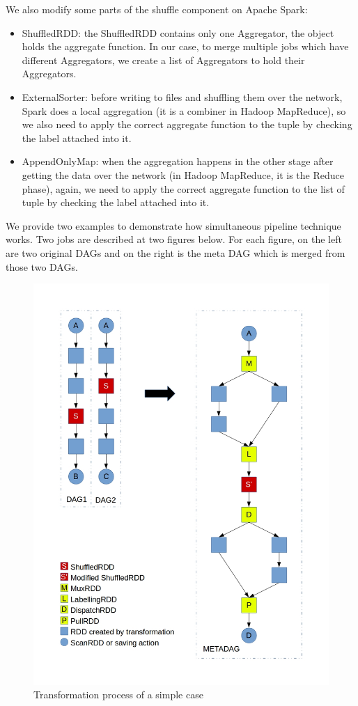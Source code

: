 We also modify some parts of the shuffle component on Apache Spark:
\begin{itemize}
\item ShuffledRDD: the ShuffledRDD contains only one Aggregator, the object holds the aggregate function. In our case, to merge multiple jobs which have different Aggregators, we create a list of Aggregators to hold their Aggregators.
\item ExternalSorter: before writing to files and shuffling them over the network, Spark does a local aggregation (it is a combiner in Hadoop MapReduce), so we also need to apply the correct aggregate function to the tuple by checking the label attached into it.
\item AppendOnlyMap: when the aggregation happens in the other stage after getting the data over the network (in Hadoop MapReduce, it is the Reduce phase), again, we need to apply the correct aggregate function to the list of tuple by checking the label attached into it.
\end{itemize}

We provide two examples to demonstrate how simultaneous pipeline technique works. Two jobs are described at two figures below. For each figure, on the left are two original DAGs and on the right is the meta DAG which is merged from those two DAGs.

\begin{figure}
\includegraphics[width=\textwidth]{Figures/singlemetajob.jpg}
\caption{Transformation process of a simple case}
\label{fig:simplemetajob}
\end{figure}

